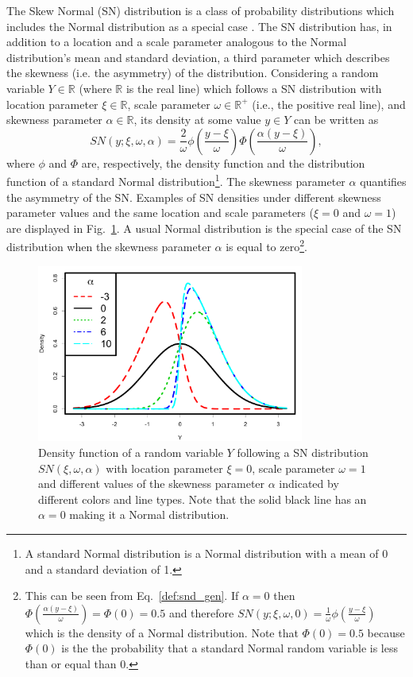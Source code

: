 \documentclass{aa}
\begin{document}
The Skew Normal (SN) distribution is a class of probability distributions which includes the Normal distribution as a special case \citep{Azzalini1985}. The SN distribution has, in addition to a location and a scale parameter analogous to the Normal distribution's mean and standard deviation, a third parameter which describes the skewness (i.e. the asymmetry) of the distribution. Considering a random variable $Y\in \mathbb R$ (where $\mathbb R$ is the real line) which follows a SN distribution with location parameter $\xi \in \mathbb R$, scale parameter $\omega \in \mathbb R^{+}$ (i.e., the positive real line), and skewness parameter $\alpha \in \mathbb R$, its density at some value $y\in Y$ can be written as 
\begin{equation} \label{def:snd_gen}
SN(y;\xi, \omega, \alpha) = \frac{2}{\omega} \phi\left(\frac{y-\xi}{\omega}\right) \Phi\left(\frac{\alpha(y-\xi)}{\omega}\right),
\end{equation}
where $\phi$ and $\Phi$ are, respectively, the density function and the distribution function of a standard Normal distribution\footnote{A standard Normal distribution is a Normal distribution with a mean of 0 and a standard deviation of 1.}.
The skewness parameter $\alpha$ quantifies the asymmetry of the SN. 
Examples of SN densities under different skewness parameter values and the same location and scale parameters ($\xi = 0$ and $\omega = 1$) are displayed in Fig.~\ref{fig:SN.plot}.  A usual Normal distribution is the special case of the SN distribution when the skewness parameter $\alpha$ is equal to zero\footnote{This can be seen from Eq.~\eqref{def:snd_gen}. If $\alpha = 0$ then $\Phi\left(\frac{\alpha(y-\xi)}{\omega}\right) = \Phi(0) = 0.5$ and therefore $SN(y;\xi, \omega, 0) = \frac{1}{\omega} \phi\left(\frac{y-\xi}{\omega}\right)$ which is the density of a Normal distribution. Note that $\Phi(0) = 0.5$ because $\Phi(0)$ is the the probability that a standard Normal random variable is less than or equal than 0.}.
%
\begin{figure}[t]
\begin{center}
\includegraphics[height = 2.3in]{Skew_Normal_densities_jjck.pdf} 
   \caption{Density function of a random variable $Y$ following a SN distribution $SN(\xi, \omega, \alpha)$ with location parameter $\xi = 0$, scale parameter $\omega = 1$ and different values of the skewness parameter $\alpha$ indicated by different colors and line types. Note that the solid black line has an $\alpha = 0$ making it a Normal distribution.}
   \label{fig:SN.plot}
\end{center}
\end{figure}
\end{document}
